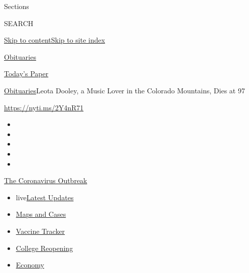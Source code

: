 Sections

SEARCH

\protect\hyperlink{site-content}{Skip to
content}\protect\hyperlink{site-index}{Skip to site index}

\href{https://www.nytimes.com/section/obituaries}{Obituaries}

\href{https://myaccount.nytimes.com/auth/login?response_type=cookie\&client_id=vi}{}

\href{https://www.nytimes.com/section/todayspaper}{Today's Paper}

\href{/section/obituaries}{Obituaries}\textbar{}Leota Dooley, a Music
Lover in the Colorado Mountains, Dies at 97

\url{https://nyti.ms/2Y4nR71}

\begin{itemize}
\item
\item
\item
\item
\item
\end{itemize}

\href{https://www.nytimes.com/news-event/coronavirus?action=click\&pgtype=Article\&state=default\&region=TOP_BANNER\&context=storylines_menu}{The
Coronavirus Outbreak}

\begin{itemize}
\tightlist
\item
  live\href{https://www.nytimes.com/2020/08/03/world/coronavirus-covid-19.html?action=click\&pgtype=Article\&state=default\&region=TOP_BANNER\&context=storylines_menu}{Latest
  Updates}
\item
  \href{https://www.nytimes.com/interactive/2020/us/coronavirus-us-cases.html?action=click\&pgtype=Article\&state=default\&region=TOP_BANNER\&context=storylines_menu}{Maps
  and Cases}
\item
  \href{https://www.nytimes.com/interactive/2020/science/coronavirus-vaccine-tracker.html?action=click\&pgtype=Article\&state=default\&region=TOP_BANNER\&context=storylines_menu}{Vaccine
  Tracker}
\item
  \href{https://www.nytimes.com/2020/08/02/us/covid-college-reopening.html?action=click\&pgtype=Article\&state=default\&region=TOP_BANNER\&context=storylines_menu}{College
  Reopening}
\item
  \href{https://www.nytimes.com/live/2020/08/03/business/stock-market-today-coronavirus?action=click\&pgtype=Article\&state=default\&region=TOP_BANNER\&context=storylines_menu}{Economy}
\end{itemize}

